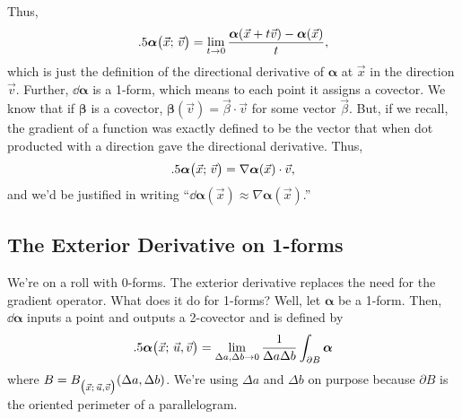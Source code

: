 Thus,
\[
	.5 \bm\alpha\big(\vec x;\, \vec v\big)
	= \lim_{t\to 0} \frac{\bm\alpha(\vec x+t\vec v) - \bm\alpha(\vec x)}{t},
\]
which is just the definition of the directional derivative of $\bm\alpha$ at $\vec x$
in the direction $\vec v$.  Further, $\dd \bm\alpha$ is a 1-form, which
means to each point it assigns a covector.  We know that if $\bm\beta$ is a covector,
$\bm\beta(\vec v) = \vec \beta \cdot \vec v$ for some vector $\vec \beta$.
But, if we recall, the gradient of a function was exactly defined to be the
vector that when dot producted with a direction gave the directional derivative.
Thus,
\[
	.5 \bm\alpha\big(\vec x;\, \vec v\big) = \nabla \bm\alpha(\vec x)\cdot \vec v,
\]
and we'd be justified in writing ``$\dd \bm\alpha(\vec x) \approx \nabla \bm\alpha(\vec x)$.''

\subsection{The Exterior Derivative on 1-forms}
We're on a roll with 0-forms.  The exterior derivative replaces the need
for the gradient operator.  What does it do for 1-forms?  Well,
let $\bm\alpha$ be a 1-form.  Then, $\dd \bm\alpha$ inputs a point and outputs
a 2-covector and is defined by 
\[
	.5 \bm\alpha\big(\vec x;\, \vec u,\vec v\big)
	= \lim_{\Delta a,\Delta b\to 0} \frac{1}{\Delta a\Delta b} \int_{\partial B} \bm\alpha
\]
where $B=B_{\big(\vec x;\, \vec u,\vec v\big)}(\Delta a,\Delta b)$. We're using $\Delta a$
and $\Delta b$ on purpose because $\partial B$ is the oriented perimeter of a parallelogram.

